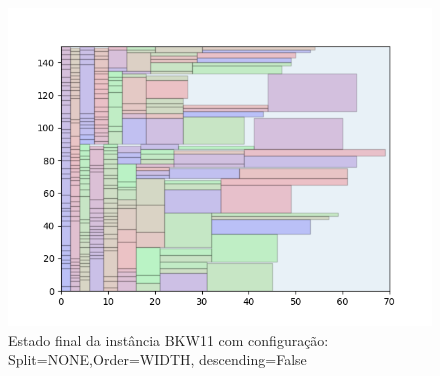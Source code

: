 \begin{figure}[H]
    \centering
    \caption[]{Estado final da instância BKW11 com configuração: Split=NONE,Order=WIDTH, descending=False}
    \label{fig:bkw11-none-width-false}
    \includegraphics[scale=0.5]{output/figures/bkw/bkw11/none/width/false/000}
\end{figure}